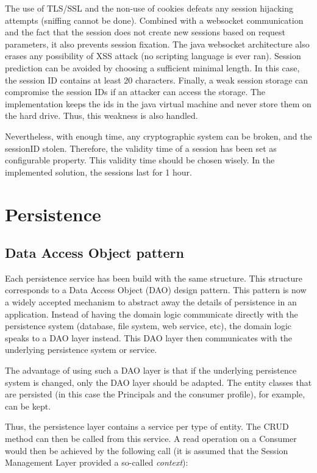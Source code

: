 The use of TLS/SSL and the non-use of cookies defeats any session hijacking attempts (sniffing cannot be done). Combined with a websocket communication and the fact that the session does not create new sessions based on request parameters, it also prevents session fixation. The java websocket architecture also erases any possibility of XSS attack (no scripting language is ever ran).
Session prediction can be avoided by choosing a sufficient minimal length. In this case, the session ID contains at least 20 characters. Finally, a weak session storage can compromise the session IDs if an attacker can access the storage. The implementation keeps the ids in the java virtual machine and never store them on the hard drive. Thus, this weakness is also handled.

Nevertheless, with enough time, any cryptographic system can be broken, and the sessionID stolen. Therefore, the validity time of a session has been set as configurable property. This validity time should be chosen wisely. In the implemented solution, the sessions last for 1 hour.


\section{Persistence}

\subsection{Data Access Object pattern}
Each persistence service has been build with the same structure. This structure corresponds to a Data Access Object (DAO) design pattern. This pattern is now a widely accepted mechanism to abstract away the details of persistence in an application. Instead of having the domain logic communicate directly with the persistence system (database, file system, web service, etc), the domain logic speaks to a DAO layer instead. This DAO layer then communicates with the underlying persistence system or service.

The advantage of using such a DAO layer is that if the underlying persistence system is changed, only the DAO layer should be adapted. The entity classes that are persisted (in this case the Principals and the consumer profile), for example, can be kept. 

Thus, the persistence layer contains a service per type of entity. The CRUD method can then be called from this service. A read operation on a Consumer would then be achieved by the following call (it is assumed that the Session Management Layer provided a so-called \textit{context}):

